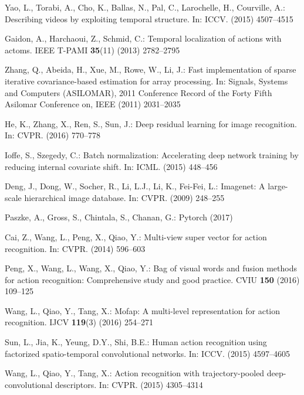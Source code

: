 \documentclass[runningheads,a4paper]{llncs}
\begin{document}
\begin{thebibliography}{10}
	Yao, L., Torabi, A., Cho, K., Ballas, N., Pal, C., Larochelle, H., Courville,
	A.:
	\newblock Describing videos by exploiting temporal structure.
	\newblock In: ICCV. (2015)  4507--4515

	Gaidon, A., Harchaoui, Z., Schmid, C.:
	\newblock Temporal localization of actions with actoms.
	\newblock IEEE T-PAMI \textbf{35}(11) (2013)  2782--2795

	Zhang, Q., Abeida, H., Xue, M., Rowe, W., Li, J.:
	\newblock Fast implementation of sparse iterative covariance-based estimation
	for array processing.
	\newblock In: Signals, Systems and Computers (ASILOMAR), 2011 Conference Record
	of the Forty Fifth Asilomar Conference on, IEEE (2011)  2031--2035

	He, K., Zhang, X., Ren, S., Sun, J.:
	\newblock Deep residual learning for image recognition.
	\newblock In: CVPR. (2016)  770--778

	Ioffe, S., Szegedy, C.:
	\newblock Batch normalization: Accelerating deep network training by reducing
	internal covariate shift.
	\newblock In: ICML. (2015)  448--456

	Deng, J., Dong, W., Socher, R., Li, L.J., Li, K., Fei-Fei, L.:
	\newblock Imagenet: A large-scale hierarchical image database.
	\newblock In: CVPR. (2009)  248--255

	Paszke, A., Gross, S., Chintala, S., Chanan, G.:
	\newblock Pytorch (2017)

	Cai, Z., Wang, L., Peng, X., Qiao, Y.:
	\newblock Multi-view super vector for action recognition.
	\newblock In: CVPR. (2014)  596--603

	Peng, X., Wang, L., Wang, X., Qiao, Y.:
	\newblock Bag of visual words and fusion methods for action recognition:
	Comprehensive study and good practice.
	\newblock CVIU \textbf{150} (2016)  109--125

	Wang, L., Qiao, Y., Tang, X.:
	\newblock Mofap: A multi-level representation for action recognition.
	\newblock IJCV \textbf{119}(3) (2016)  254--271

	Sun, L., Jia, K., Yeung, D.Y., Shi, B.E.:
	\newblock Human action recognition using factorized spatio-temporal
	convolutional networks.
	\newblock In: ICCV. (2015)  4597--4605

	Wang, L., Qiao, Y., Tang, X.:
	\newblock Action recognition with trajectory-pooled deep-convolutional
	descriptors.
	\newblock In: CVPR. (2015)  4305--4314


\end{thebibliography}
\end{document}
